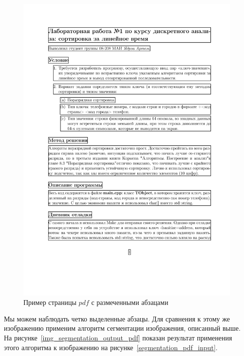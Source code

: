 \begin{figure}
    \includegraphics[scale=0.65]{img/paragraph/pdf_output.jpg}
    \caption{Пример страницы $pdf$ с размеченными абзацами}
    \label{segmentation_pdf_output}
\end{figure}

Мы можем наблюдать четко выделенные абзацы. Для сравнения к этому же изображению применим алгоритм сегментации изображения, описанный выше. 
На рисунке~\ref{img_segmentation_output_pdf} показан результат применения этого алгоритма к изображению на рисунке~\ref{segmentation_pdf_input}.

